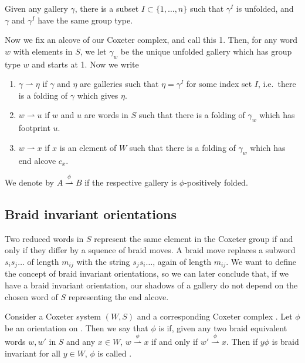 \documentclass[11pt]{article}
\begin{document}
\begin{corollary}
    Given any gallery $\gamma$, there is a subset $I\subset \{1,\hdots ,n\}$ such that $\gamma^I$ is unfolded, and $\gamma$ and $\gamma^I$ have the same group type.
\end{corollary}


Now we fix an alcove of our Coxeter complex, and call this 1. Then, for any word $w$ with elements in $S$, we let $\gamma_w$ be the unique unfolded gallery which has group type $w$ and starts at 1. Now we write
\begin{enumerate}
    \item $\gamma \rightharpoonup \eta$ if $\gamma$ and $\eta$ are galleries such that $\eta = \gamma^I$ for some index set $I$, i.e.\ there is a folding of $\gamma$ which gives $\eta$.
    \item $w\rightharpoonup u$ if $w$ and $u$ are words in $S$ such that there is a folding of $\gamma_w$ which has footprint $u$.
    \item $w\rightharpoonup x$ if $x$ is an element of $W$ such that there is a folding of $\gamma_w$ which has end alcove $c_x$. 
\end{enumerate}
We denote by $A\stackrel{\phi}{\rightharpoonup} B$ if the respective gallery is $\phi$-positively folded.


\subsection{Braid invariant orientations}

Two reduced words in $S$ represent the same element in the Coxeter group if and only if they differ by a squence of braid moves. A braid move replaces a subword $s_is_j\hdots $ of length $m_{ij}$ with the string $s_js_i\hdots $, again of length $m_{ij}$. We want to define the concept of braid invariant orientations, so we can later conclude that, if we have a braid invariant orientation, our shadows of a gallery do not depend on the chosen word of $S$ representing the end alcove. 

\begin{definition}
    Consider a Coxeter system $(W,S)$ and a corresponding Coxeter complex \sg. Let $\phi$ be an orientation on \sg. Then we say that $\phi$ is  if, given any two braid equivalent words $w,w'$ in $S$ and any $x\in W$, $w\stackrel{\phi}{\rightharpoonup} x$ if and only if $w'\stackrel{\phi}{\rightharpoonup} x$. Then if $y\phi$ is braid invariant for all $y\in W$, $\phi$ is called . 
\end{definition}
\end{document}
